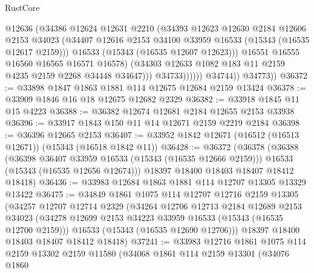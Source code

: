 \begin{lexlean}{RustCore}
\begin{coremodule}
                            @12636
                            (@34386
                              @12624
                              @12631
                              @2210
                              (@34393
                                @12623
                                @12630
                                @2184
                                @12606
                                @2153
                                @34023
                                (@34407
                                  @12616
                                  @2153
                                  @34100
                                  @33959
                                  @16533
                                  (@15343 (@16535 @12617 @2159)))
                                @16533
                                (@15343 (@16535 @12607 @12623)))
                              @16551
                              @16555
                              @16560
                              @16565
                              @16571
                              @16578)
                            (@34303 @12633 @1082 @183 @11 @2159 @4235 @2159 @2268 @34448 @34647)))
                        @34733))))))
            @34744))
        @34773))
@36372 := @33898 @1847 @1863 @1881 @114 @12675 @12684 @2159 @13424
@36378 := @33909 @1846 @16 @18 @12675 @12682 @2329
@36382 := @33918 @1845 @11 @15 @4223
@36388 := @36382 @12674 @12681 @2184 @12655 @2153 @33938
@36396 := @33917 @1843 @150 @11 @14 @12671 @2159 @2219 @2184
@36398 := @36396 @12665 @2153
@36407 := @33952 @1842 @12671 (@16512 (@16513 @12671)) (@15343 (@16518 @1842 @11))
@36428 := @36372
    (@36378
      (@36388
        (@36398 @36407 @33959 @16533 (@15343 (@16535 @12666 @2159)))
        @16533
        (@15343 (@16535 @12656 @12674)))
      @18397
      @18400
      @18403
      @18407
      @18412
      @18418)
@36436 := @33983 @12684 @1863 @1881 @114 @12707 @13305 @13329 @13422
@36475 := @34849
    @1861
    @1075
    @114
    @12707
    @12716
    @2159
    @13305
    (@34257
      @12707
      @12714
      @2329
      (@34264
        @12706
        @12713
        @2184
        @12689
        @2153
        @34023
        (@34278 @12699 @2153 @34223 @33959 @16533 (@15343 (@16535 @12700 @2159)))
        @16533
        (@15343 (@16535 @12690 @12706)))
      @18397
      @18400
      @18403
      @18407
      @18412
      @18418)
@37241 := @33983
    @12716
    @1861
    @1075
    @114
    @2159
    @13302
    @2159
    @11580
    (@34068
      @1861
      @114
      @2159
      @13301
      (@34076
        @1860

\end{coremodule}
\end{lexlean}
